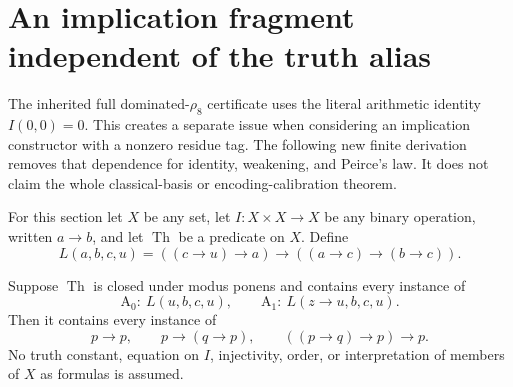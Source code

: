 \section{An implication fragment independent of the truth alias}
\label{sec:alias-free-IKP}

The inherited full dominated-$\rho_8$ certificate uses the literal
arithmetic identity $I(0,0)=0$. This creates a separate issue when
considering an implication constructor with a nonzero residue tag.
The following new finite derivation removes that dependence for
identity, weakening, and Peirce's law. It does not claim the whole
classical-basis or encoding-calibration theorem.

For this section let $X$ be any set, let $I:X\times X\to X$ be any
binary operation, written $a\to b$, and let $\operatorname{Th}$ be a
predicate on $X$. Define
\[
 L(a,b,c,u)=((c\to u)\to a)\to((a\to c)\to(b\to c)).
\]

\begin{theorem}
\label{thm:alias-free-IKP}
Suppose $\operatorname{Th}$ is closed under modus ponens and contains
every instance of
\[
 \mathrm A_0:\ L(u,b,c,u),\qquad
 \mathrm A_1:\ L(z\to u,b,c,u).
\]
Then it contains every instance of
\[
 p\to p,\qquad p\to(q\to p),\qquad ((p\to q)\to p)\to p.
\]
No truth constant, equation on $I$, injectivity, order, or interpretation
of members of $X$ as formulas is assumed.
\end{theorem}

